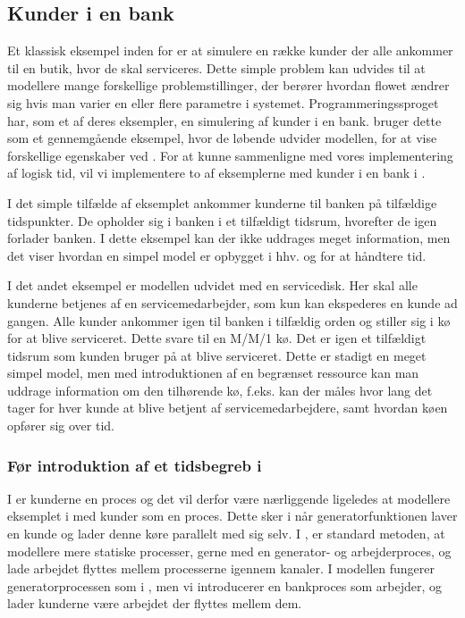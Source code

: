 \subsection{Kunder i en bank}\label{bank-eksempel}
Et klassisk eksempel inden for \des er at simulere  en række kunder der alle 
ankommer til en butik, hvor de skal serviceres. Dette simple problem kan 
udvides til at modellere mange forskellige problemstillinger, der berører 
hvordan flowet ændrer sig hvis man varier en eller flere parametre
i systemet. Programmeringssproget \simpy{}har, som et af deres 
eksempler, en simulering af kunder i en bank. \simpy bruger dette som et 
gennemgående eksempel, hvor de løbende udvider modellen, for at vise 
forskellige egenskaber ved \simpy. For at kunne sammenligne \simpy  med vores 
implementering af logisk tid, vil vi implementere to af eksemplerne med kunder 
i en bank i \pycsp.

I det simple tilfælde af eksemplet ankommer kunderne til banken på 
tilfældige tidspunkter.  De opholder sig i banken i et tilfældigt 
tidsrum, hvorefter de igen forlader banken. I dette eksempel kan der ikke 
uddrages meget information, men det viser hvordan en simpel model er opbygget i 
hhv.  \simpy og \pycsp for at håndtere tid.

I det andet eksempel er modellen udvidet med en servicedisk. Her skal alle 
kunderne betjenes af en servicemedarbejder, som kun kan ekspederes en kunde ad 
gangen. Alle kunder ankommer igen til banken i tilfældig orden og stiller sig i 
kø for at blive serviceret. Dette  svare til en M/M/1 kø. Det er igen et tilfældigt tidsrum som kunden bruger på at blive 
serviceret.  Dette er stadigt en meget simpel model, men med introduktionen af 
en begrænset ressource kan man uddrage information om den tilhørende kø, f.eks. 
kan der måles hvor lang det tager for hver kunde at blive betjent af 
servicemedarbejdere, samt hvordan køen opfører sig over tid. 

\subsubsection{Før introduktion af et tidsbegreb i \pycsp}
I \simpy er kunderne en proces og det vil derfor være nærliggende ligeledes at 
modellere eksemplet i \pycsp med kunder som en proces. Dette sker i  \simpy når
generatorfunktionen laver en kunde og lader denne køre parallelt med sig selv.  
I \pycsp, er standard metoden, at 
modellere mere statiske processer, gerne med en generator- og 
arbejderproces, og lade arbejdet flyttes 
mellem processerne igennem kanaler. I \pycsp modellen fungerer 
generatorprocessen som i \simpy, men vi introducerer en bankproces 
som arbejder, og lader kunderne være arbejdet der flyttes mellem dem. 

